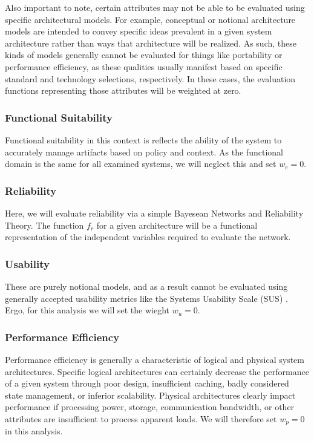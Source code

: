 Also important to note, certain attributes may not be able to be evaluated using specific architectural models.  For example, conceptual or notional architecture models are intended to convey specific ideas prevalent in a given system architecture rather than ways that architecture will be realized.  As such, these kinds of models generally cannot be evaluated for things like portability or performance efficiency, as these qualities usually manifest based on specific standard and technology selections, respectively.  In these cases, the evaluation functions representing those attributes will be weighted at zero.

\subsubsection*{Functional Suitability}
Functional suitability in this context is reflects the ability of the system to accurately manage artifacts based on policy and context.  As the functional domain is the same for all examined systems, we will neglect this and set $ w_{e} = 0 $.

\subsubsection*{Reliability}
Here, we will evaluate reliability via a simple Bayesean Networks and Reliability Theory.  The function $ f_{r} $ for a given architecture will be a functional representation of the independent variables required to evaluate the network.

\subsubsection*{Usability}
These are purely notional models, and as a result cannot be evaluated using generally accepted usability metrics like the Systems Usability Scale (SUS) \cite{SYSTEM_USABILITY_SCALE}.  Ergo, for this analysis we will set the wieght $w_{u} = 0$.

\subsubsection*{Performance Efficiency}
Performance efficiency is generally a characteristic of logical and physical system architectures.  Specific logical architectures can certainly decrease the performance of a given system through poor design, insufficient caching, badly considered state management, or inferior scalability.  Physical architectures clearly impact performance if processing power, storage, communication bandwidth, or other attributes are insufficient to process apparent loads.  We will therefore set $w_{p} = 0$ in this analysis.

